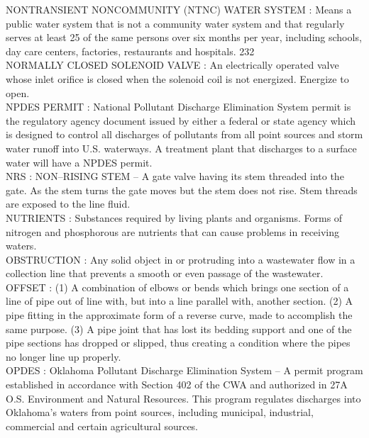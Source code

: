 \vspace{0.15cm}
NONTRANSIENT NONCOMMUNITY (NTNC) WATER SYSTEM :  Means a public water system that is not a community water system and that regularly serves at least 25 of the same persons over six months per year, including schools, day care centers, factories, restaurants and hospitals. 232 \\
\vspace{0.15cm}
NORMALLY CLOSED SOLENOID VALVE :   An electrically operated valve whose inlet orifice is closed when the solenoid coil is not energized. Energize to open.\\
\vspace{0.15cm}
NPDES PERMIT :  National Pollutant Discharge Elimination System permit is the regulatory agency document issued by either a federal or state agency which is designed to control all discharges of pollutants from all point sources and storm water runoff into U.S. waterways. A treatment plant that discharges to a surface water will have a NPDES permit.\\
\vspace{0.15cm}
NRS :  NON–RISING STEM –  A gate valve having its stem threaded into the gate. As the stem turns the gate moves but the stem does not rise. Stem threads are exposed to the line fluid.\\
\vspace{0.15cm}
NUTRIENTS :  Substances required by living plants and organisms. Forms of nitrogen and phosphorous are nutrients that can cause problems in receiving waters.\\
\vspace{0.15cm}
OBSTRUCTION :  Any solid object in or protruding into a wastewater flow in a collection line that prevents a smooth or even passage of the wastewater. \\
\vspace{0.15cm}
OFFSET :  (1) A combination of elbows or bends which brings one section of a line of pipe out of line with, but into a line parallel with, another section. (2) A pipe fitting in the approximate form of a reverse curve, made to accomplish the same purpose. (3) A pipe joint that has lost its bedding support and one of the pipe sections has dropped or slipped, thus creating a condition where the pipes no longer line up properly. \\
\vspace{0.15cm}
OPDES :  Oklahoma Pollutant Discharge Elimination System – A permit program established in accordance with Section 402 of the CWA and authorized in 27A O.S. Environment and Natural Resources. This program regulates discharges into Oklahoma’s waters from point sources, including municipal, industrial, commercial and certain agricultural sources. \\

